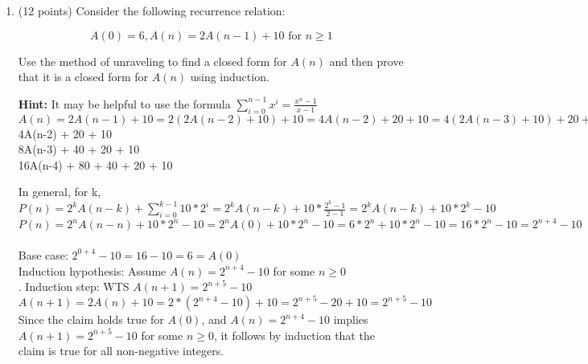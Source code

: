 \documentclass[10pt,letterpaper,unboxed,cm]{article}
\begin{document}
\begin{enumerate}
    \item (12 points) Consider the following recurrence relation:

    \[A(0) = 6, A(n) = 2A(n-1) +10\textrm{ for } n \geq 1\]

    Use the method of unraveling to find a closed form for $A(n)$ and then prove that it is a closed form for $A(n)$ using induction.
    \bigskip

    {\bf Hint:} It may be helpful to use the formula $\sum_{i=0}^{n-1} x^i = \frac{x^n - 1}{x-1}$\\

    $A(n) = 2A(n-1) +10 = 2(2A(n-2) + 10) + 10 = 4A(n-2) + 20 + 10 = 4(2A(n-3)+10) + 20 + 10 = 8A(n-3) + 40 + 20 + 10 = 8(2A(n-4) + 10) + 40 + 20 + 10 = 16A(n-4) + 80 + 40 + 20 + 10$\\4A(n-2) + 20 + 10 \\8A(n-3) + 40 + 20 + 10 \\ 16A(n-4) + 80 + 40 + 20 + 10

    In general, for k, $P(n) = 2^kA(n-k)+\sum_{i=0}^{k-1} 10*2^i = 2^kA(n-k)+10*\frac{2^k - 1}{2-1}=2^kA(n-k)+10*2^k - 10$\\
    $P(n) = 2^nA(n-n)+10*2^n - 10 = 2^nA(0) + 10*2^n - 10 = 6*2^n+ 10*2^n-10 = 16*2^n - 10 = 2^{n+4} - 10$\\ \\
    Base case: $2^{0 + 4} - 10 = 16 - 10 = 6 = A(0)$\\
    Induction hypothesis: Assume $A(n) = 2^{n+4} - 10$ for some $n \geq 0$\\.
    Induction step: WTS $A(n + 1) = 2^{n+5} - 10$\\
    $A(n+1) = 2A(n) + 10 = 2 *(2^{n+4}-10) + 10 = 2^{n+5} -20 + 10 = 2^{n+5} - 10$\\
    Since the claim holds true for $A(0)$, and $A(n) = 2^{n+4} - 10$ implies $A(n+1) = 2^{n+5} - 10$ for some $n \geq 0$, it follows by induction that the claim is true for all non-negative integers.
\end{enumerate}
\end{document}
